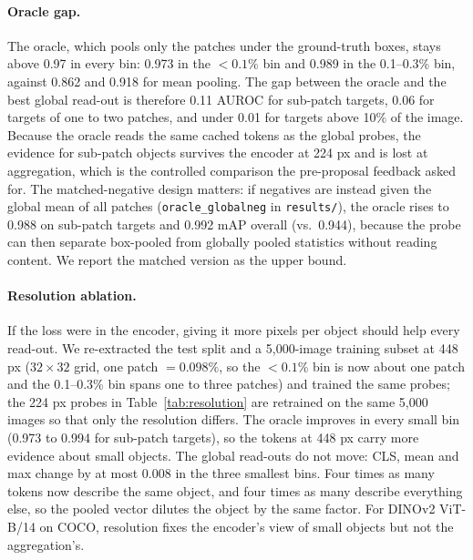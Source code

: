 \documentclass[10pt,letterpaper,twocolumn]{article}
\begin{document}
\paragraph{Oracle gap.}
The oracle, which pools only the patches under the ground-truth boxes, stays above 0.97 in
every bin: 0.973 in the $<0.1\%$ bin and 0.989 in the 0.1--0.3\% bin, against 0.862 and 0.918
for mean pooling. The gap between the oracle and the best global read-out is therefore
0.11 AUROC for sub-patch targets, 0.06 for targets of one to two patches, and under 0.01 for
targets above 10\% of the image. Because the oracle reads the same cached tokens as the global
probes, the evidence for sub-patch objects survives the encoder at 224 px and is lost at
aggregation, which is the controlled comparison the pre-proposal feedback asked for. The
matched-negative design matters: if negatives are instead given the global mean of all
patches (\texttt{oracle\_globalneg} in \texttt{results/}), the oracle rises to 0.988 on
sub-patch targets and 0.992 mAP overall (vs.\ 0.944), because the probe can then separate
box-pooled from globally pooled statistics without reading content. We report the matched
version as the upper bound.

\paragraph{Resolution ablation.}
If the loss were in the encoder, giving it more pixels per object should help every read-out.
We re-extracted the test split and a 5,000-image training subset at 448 px ($32\times32$ grid,
one patch $=0.098\%$, so the $<0.1\%$ bin is now about one patch and the 0.1--0.3\% bin spans
one to three patches) and trained the same probes; the 224 px probes in
Table~\ref{tab:resolution} are retrained on the same 5,000 images so that only the resolution
differs. The oracle improves in every small bin (0.973 to 0.994 for sub-patch targets), so the
tokens at 448 px carry more evidence about small objects. The global read-outs do not move:
CLS, mean and max change by at most 0.008 in the three smallest bins. Four times as many tokens
now describe the same object, and four times as many describe everything else, so the pooled
vector dilutes the object by the same factor. For DINOv2 ViT-B/14 on COCO, resolution fixes the
encoder's view of small objects but not the aggregation's.
\end{document}
